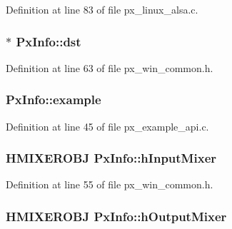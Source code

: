 Definition at line 83 of file px\+\_\+linux\+\_\+alsa.\+c.

\subsubsection[{\texorpdfstring{dst}{dst}}]{$\ast$ Px\+Info\+::dst}\hypertarget{struct_px_info_ad486fa202a647f1706210cc3a278b5e6}{}\label{struct_px_info_ad486fa202a647f1706210cc3a278b5e6}


Definition at line 63 of file px\+\_\+win\+\_\+common.\+h.

\subsubsection[{\texorpdfstring{example}{example}}]{ Px\+Info\+::example}\hypertarget{struct_px_info_a9afce6fca9e51e573ca82289554fa29d}{}\label{struct_px_info_a9afce6fca9e51e573ca82289554fa29d}


Definition at line 45 of file px\+\_\+example\+\_\+api.\+c.

\subsubsection[{\texorpdfstring{h\+Input\+Mixer}{hInputMixer}}]{\setlength{\rightskip}{0pt plus 5cm}H\+M\+I\+X\+E\+R\+O\+BJ Px\+Info\+::h\+Input\+Mixer}\hypertarget{struct_px_info_a4893340121363c3ae6725262cd91f517}{}\label{struct_px_info_a4893340121363c3ae6725262cd91f517}


Definition at line 55 of file px\+\_\+win\+\_\+common.\+h.

\subsubsection[{\texorpdfstring{h\+Output\+Mixer}{hOutputMixer}}]{\setlength{\rightskip}{0pt plus 5cm}H\+M\+I\+X\+E\+R\+O\+BJ Px\+Info\+::h\+Output\+Mixer}\hypertarget{struct_px_info_a4410e9d75376210c24fb1bd5f7b64ab1}{}\label{struct_px_info_a4410e9d75376210c24fb1bd5f7b64ab1}


